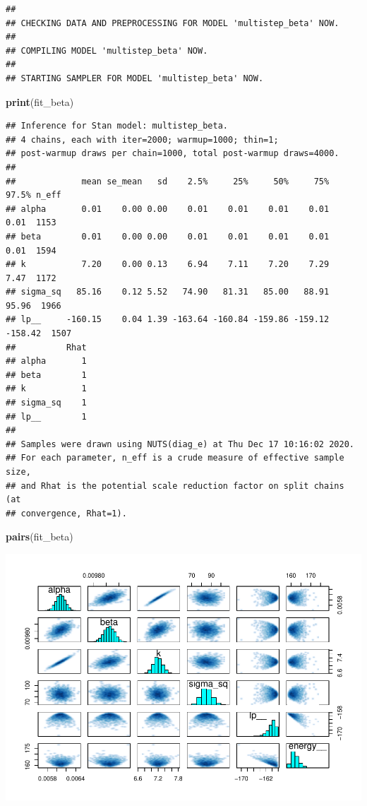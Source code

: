 \documentclass[
]{article}
\newenvironment{Shaded}{\begin{snugshade}}{\end{snugshade}}
\newcommand{\KeywordTok}[1]{\textcolor[rgb]{0.13,0.29,0.53}{\textbf{#1}}}
\newcommand{\NormalTok}[1]{#1}
\begin{document}
\begin{verbatim}
## 
## CHECKING DATA AND PREPROCESSING FOR MODEL 'multistep_beta' NOW.
## 
## COMPILING MODEL 'multistep_beta' NOW.
## 
## STARTING SAMPLER FOR MODEL 'multistep_beta' NOW.
\end{verbatim}

\begin{Shaded}
\begin{Highlighting}[]
\KeywordTok{print}\NormalTok{(fit_beta)}
\end{Highlighting}
\end{Shaded}

\begin{verbatim}
## Inference for Stan model: multistep_beta.
## 4 chains, each with iter=2000; warmup=1000; thin=1; 
## post-warmup draws per chain=1000, total post-warmup draws=4000.
## 
##             mean se_mean   sd    2.5%     25%     50%     75%   97.5% n_eff
## alpha       0.01    0.00 0.00    0.01    0.01    0.01    0.01    0.01  1153
## beta        0.01    0.00 0.00    0.01    0.01    0.01    0.01    0.01  1594
## k           7.20    0.00 0.13    6.94    7.11    7.20    7.29    7.47  1172
## sigma_sq   85.16    0.12 5.52   74.90   81.31   85.00   88.91   95.96  1966
## lp__     -160.15    0.04 1.39 -163.64 -160.84 -159.86 -159.12 -158.42  1507
##          Rhat
## alpha       1
## beta        1
## k           1
## sigma_sq    1
## lp__        1
## 
## Samples were drawn using NUTS(diag_e) at Thu Dec 17 10:16:02 2020.
## For each parameter, n_eff is a crude measure of effective sample size,
## and Rhat is the potential scale reduction factor on split chains (at 
## convergence, Rhat=1).
\end{verbatim}

\begin{Shaded}
\begin{Highlighting}[]
\KeywordTok{pairs}\NormalTok{(fit_beta)}
\end{Highlighting}
\end{Shaded}

\includegraphics{multistep-model-comparison_files/figure-latex/model_beta-1.pdf}
\end{document}
